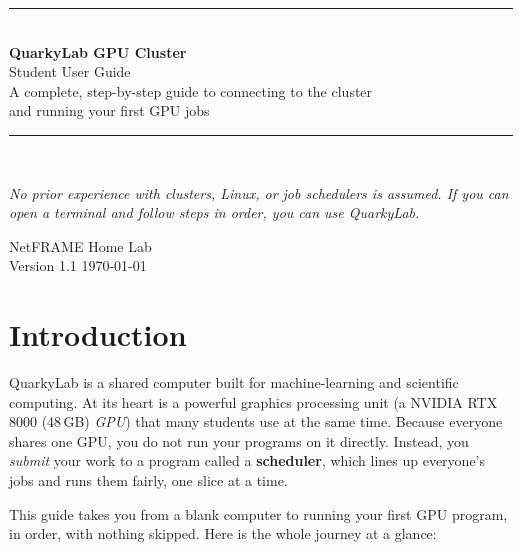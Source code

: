 \documentclass[11pt]{article}
\newcommand{\LabName}{QuarkyLab}                       %
\newcommand{\GPUName}{NVIDIA RTX 8000 (48\,GB)}        %
\newcommand{\GuideVersion}{1.1}
\newcommand{\GuideOwner}{NetFRAME Home Lab}
\begin{document}
\begin{titlepage}
\centering
\vspace*{2.2cm}
{\color{quarkA}\rule{\linewidth}{2pt}}\\[0.5cm]
{\Huge\bfseries\color{quarkA} \LabName{} GPU Cluster}\\[0.35cm]
{\LARGE\color{quarkB} Student User Guide}\\[0.4cm]
{\large A complete, step-by-step guide to connecting to the cluster\\ and running your first GPU jobs}\\[0.4cm]
{\color{quarkA}\rule{\linewidth}{2pt}}\\[1.4cm]

\begin{tcolorbox}[colback=quarkB!6,colframe=quarkB,width=0.82\linewidth,arc=3pt,boxrule=0.8pt]
\centering\itshape No prior experience with clusters, Linux, or job schedulers is assumed. If you can open a terminal and follow steps in order, you can use \LabName.
\end{tcolorbox}

\vfill
{\large\GuideOwner}\\[0.2cm]
{\normalsize Version \GuideVersion{} \quad\textbullet\quad \today}
\vspace*{1.5cm}
\end{titlepage}

\tableofcontents
\thispagestyle{fancy}
\clearpage

\section{Introduction}
\LabName{} is a shared computer built for machine-learning and scientific computing. At its heart is a powerful graphics processing unit (a \GPUName{} \emph{GPU}) that many students use at the same time. Because everyone shares one GPU, you do not run your programs on it directly. Instead, you \emph{submit} your work to a program called a \textbf{scheduler}, which lines up everyone's jobs and runs them fairly, one slice at a time.

This guide takes you from a blank computer to running your first GPU program, in order, with nothing skipped. Here is the whole journey at a glance:
\end{document}
